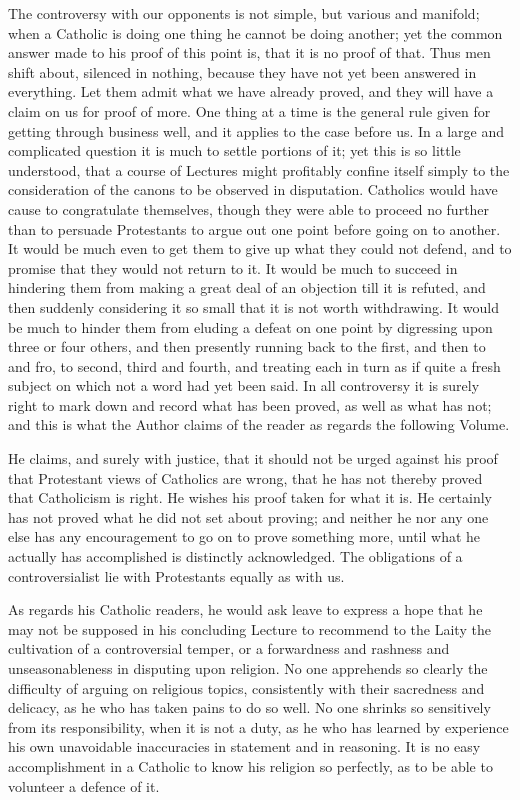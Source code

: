 The controversy with our opponents is not simple, but
various and manifold; when a Catholic is doing one thing
he cannot be doing another; yet the common answer made to
his proof of this point is, that it is no proof of that.
Thus men shift about, silenced in nothing, because they
have not yet been answered in everything. Let them admit
what we have already proved, and they will have a claim
on us for proof of more. One thing at a time is the
general rule given for getting through business well, and
it applies to the case before us. In a large and
complicated question it is much to settle portions of it;
yet this is so little understood, that a course of
Lectures might profitably confine itself simply to the
consideration of the canons to be observed in
disputation. Catholics would have cause to congratulate
themselves, though they were able to proceed no further
than to persuade Protestants to argue out one point
before going on to another. It would be much even to get
them to give up what they could not defend, and to
promise that they would not return to it. It would be
much to succeed in hindering them from making a great
deal of an objection till it is refuted, and then
suddenly considering it so small that it is not worth
withdrawing. It would be much to hinder them from eluding
a defeat on one point by digressing upon three or four
others, and then presently running back to the first, and
then to and fro, to second, third and fourth, and
treating each in turn as if quite a fresh subject on
which not a word had yet been said. In all controversy it
is surely right to mark down and record what has been
proved, as well as what has not; and this is what the
Author claims of the reader as regards the following
Volume.


He claims, and surely with justice, that it should not
be urged against his proof that Protestant views of
Catholics are wrong, that he has not thereby proved that
Catholicism is right. He wishes his proof taken for what
it is. He certainly has not proved what he did not set
about proving; and neither he nor any one else has any
encouragement to go on to prove something more, until
what he actually has accomplished is distinctly
acknowledged. The obligations of a controversialist lie
with Protestants equally as with us.


As regards his Catholic readers, he would ask leave to
express a hope that he may not be supposed in his
concluding Lecture to recommend to the Laity the
cultivation of a controversial temper, or a forwardness
and rashness and unseasonableness in disputing upon
religion. No one apprehends so clearly the difficulty of
arguing on religious topics, consistently with their
sacredness and delicacy, as he who has taken pains to do
so well. No one shrinks so sensitively from its
responsibility, when it is not a duty, as he who has
learned by experience his own unavoidable inaccuracies in
statement and in reasoning. It is no easy accomplishment
in a Catholic to know his religion so perfectly, as to be
able to volunteer a defence of it.

